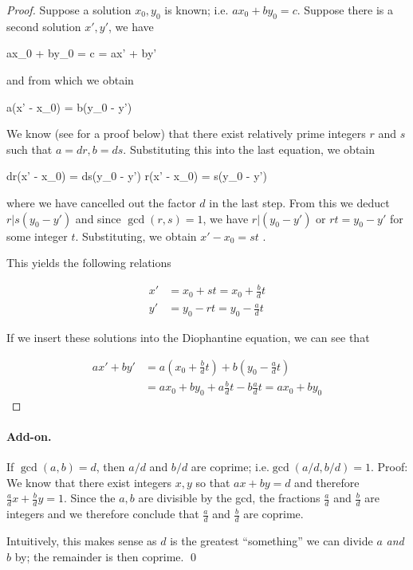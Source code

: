 \begin{proof}
  Suppose a solution $x_0, y_0$ is known; i.e. $ax_0 + by_0 = c$. Suppose there is a second solution $x', y'$, we have

  \bee
  ax_0 + by_0 = c = ax' + by'
  \eee

  and from which we obtain

  \bee
  a(x' - x_0) = b(y_0 - y')
  \eee

  We know (see for a proof below) that there exist relatively prime integers $r$ and $s$ such that $a = dr, b = ds$. Substituting this into the last equation, we obtain

  \bee
  dr(x' - x_0) = ds(y_0 - y') \rightarrow r(x' - x_0) = s(y_0 - y')
  \eee

  where we have cancelled out the factor $d$ in the last step. From this we deduct $r | s(y_0 - y')$ and since $\gcd(r,s) = 1$, we have $r | (y_0 - y')$ or $rt = y_0 - y'$ for some integer $t$. Substituting, we obtain $x' - x_0 = st$ .

  This yields the following relations

  \begin{align*}
    x' &= x_0 + st = x_0 + \frac{b}{d}t \\
    y' &= y_0 - rt = y_0 - \frac{a}{d}t
  \end{align*}

  If we insert these solutions into the Diophantine equation, we can see that

  \begin{align*}
    ax' + by' &= a \left( x_0 + \frac{b}{d}t \right) + b \left(  y_0 - \frac{a}{d}t \right) \\
              &= ax_0 + by_0 + a \frac{b}{d}t - b \frac{a}{d}t = ax_0 + by_0
  \end{align*}
\end{proof}

\paragraph{Add-on.} If $\gcd(a,b) = d$, then $a/d$ and $b/d$ are coprime; i.e.$\gcd(a/d, b/d) = 1$. Proof: We know that there exist integers $x, y$ so that $ax + by = d$ and therefore $\frac{a}{d}x + \frac{b}{d}y = 1$. Since the $a, b$ are divisible by the gcd, the fractions $\frac{a}{d}$ and $\frac{b}{d}$ are integers and we therefore conclude that $\frac{a}{d}$ and $\frac{b}{d}$ are coprime.

Intuitively, this makes sense as $d$ is the greatest ``something'' we can divide $a$ \emph{and} $b$ by; the remainder is then coprime. \qed

